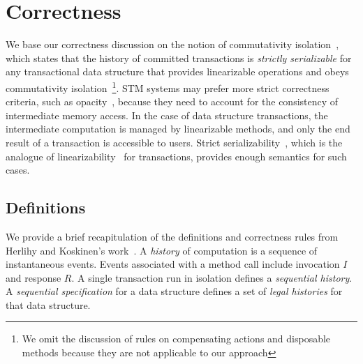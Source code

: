 \documentclass[]{sig-alternate-05-2015}
\begin{document}
\section{Correctness}
\label{sec:correctness}
We base our correctness discussion on the notion of commutativity isolation~\cite{herlihy2008transactional}, which states that the history of committed transactions is \emph{strictly serializable} for any transactional data structure that provides linearizable operations and obeys commutativity isolation~\footnote{We omit the discussion of rules on compensating actions and disposable methods because they are not applicable to our approach}.
STM systems may prefer more strict correctness criteria, such as opacity~\cite{guerraoui2008correctness}, because they need to account for the consistency of intermediate memory access.
In the case of data structure transactions, the intermediate computation is managed by linearizable methods, and only the end result of a transaction is accessible to users.
Strict serializability~\cite{papadimitriou1979serializability}, which is the analogue of linearizability~\cite{herlihy1990linearizability} for transactions, provides enough semantics for such cases.

\subsection{Definitions}
We provide a brief recapitulation of the definitions and correctness rules from Herlihy and Koskinen's work~\cite{herlihy2008transactional}.
A \emph{history} of computation is a sequence of instantaneous events.
Events associated with a method call include invocation $I$ and response $R$.
A single transaction run in isolation defines a \emph{sequential history}.
A \emph{sequential specification} for a data structure defines a set of \emph{legal histories} for that data structure.
\end{document}
